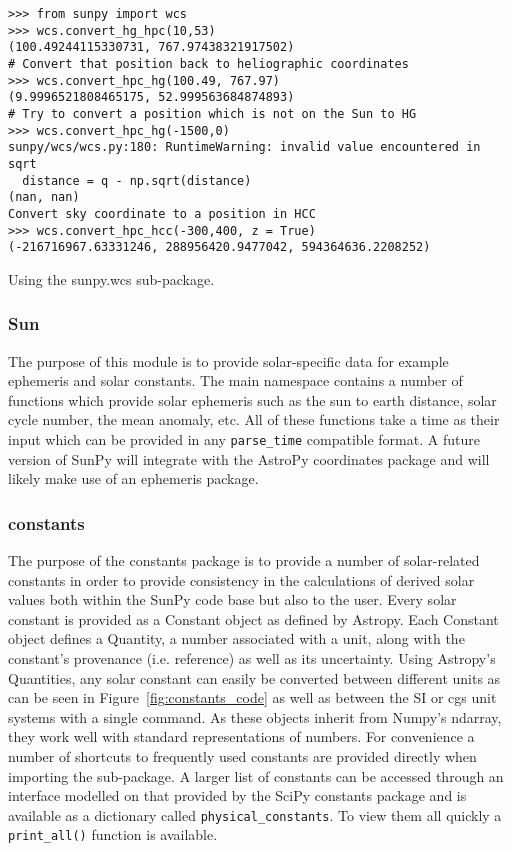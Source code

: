 \begin{listing}[H]
\begin{verbatim}
>>> from sunpy import wcs
>>> wcs.convert_hg_hpc(10,53)
(100.49244115330731, 767.97438321917502)
# Convert that position back to heliographic coordinates
>>> wcs.convert_hpc_hg(100.49, 767.97)
(9.9996521808465175, 52.999563684874893)
# Try to convert a position which is not on the Sun to HG
>>> wcs.convert_hpc_hg(-1500,0)
sunpy/wcs/wcs.py:180: RuntimeWarning: invalid value encountered in sqrt
  distance = q - np.sqrt(distance)
(nan, nan)
Convert sky coordinate to a position in HCC
>>> wcs.convert_hpc_hcc(-300,400, z = True)
(-216716967.63331246, 288956420.9477042, 594364636.2208252)
\end{verbatim}
\caption{Using the sunpy.wcs sub-package.}
\label{code:wcs_code}
\end{listing}

\subsubsection{Sun}
The purpose of this module is to provide solar-specific data for example ephemeris and
solar constants. The main namespace contains a number of functions which provide solar
ephemeris such as the sun to earth distance, solar cycle number, the mean anomaly, etc.
All of these functions take a time as their input which can be provided in any 
\texttt{parse\_time}
compatible format. 
A future version of SunPy will integrate with the AstroPy coordinates package and will 
likely make use of an ephemeris package.

\subsubsection{constants}
The purpose of the constants package is to provide a number of solar-related 
constants in order to provide consistency in the calculations of derived solar 
values both within the SunPy code base but also to the user. Every solar 
constant is provided as a Constant object as defined by Astropy. Each 
Constant object defines a Quantity, a number associated with a unit, along with 
the constant's provenance (i.e. reference) as well as its uncertainty. Using 
Astropy's Quantities, any solar constant can easily be converted between 
different units as can be seen in Figure~\ref{fig:constants_code} as well
as between the SI or cgs unit systems with a single command.  As these objects inherit from 
Numpy's ndarray, they work well with standard representations of numbers.
For convenience a number of shortcuts to frequently used constants are provided 
directly when importing the sub-package. A larger list of constants can be 
accessed through an interface modelled on that provided by the SciPy constants 
package and is available as a dictionary called \texttt{physical\_constants}. 
To view them all quickly a \texttt{print\_all()} function is available.

